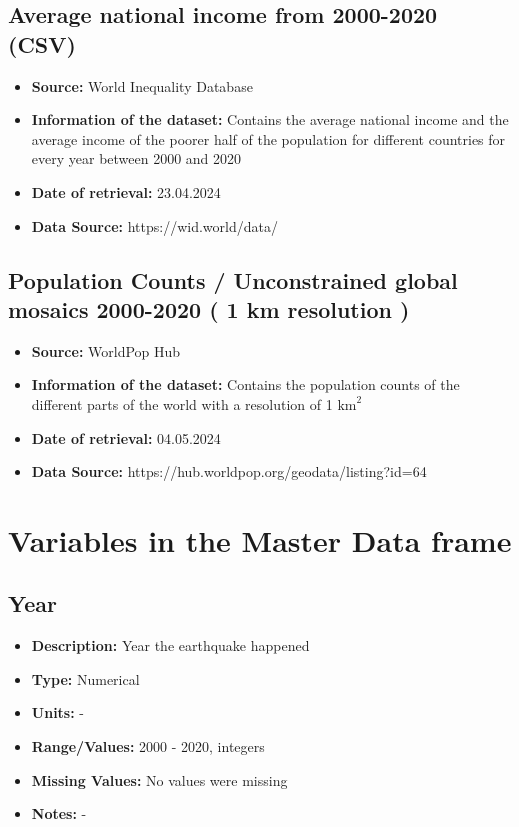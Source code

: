 \documentclass[a4paper]{article}
\begin{document}
\subsection{Average national income from 2000-2020 (CSV)}
\begin{itemize}
\item \textbf{Source:} World Inequality Database
\item \textbf{Information of the dataset:} Contains the average national income and the average income of the poorer half of the population for different countries for every year between 2000 and 2020
\item \textbf{Date of retrieval:} 23.04.2024
\item \textbf{Data Source:} https://wid.world/data/
\end{itemize}

\subsection{Population Counts / Unconstrained global mosaics 2000-2020 ( 1 km resolution )}
\begin{itemize}
\item \textbf{Source:} WorldPop Hub
\item \textbf{Information of the dataset:} Contains the population counts of the different parts of the world with a resolution of 1 $\text{km}^2$
\item \textbf{Date of retrieval:} 04.05.2024
\item \textbf{Data Source:} https://hub.worldpop.org/geodata/listing?id=64
\end{itemize}

\section{Variables in the Master Data frame}

\subsection{Year}
\begin{itemize}
    \item \textbf{Description:} Year the earthquake happened
    \item \textbf{Type:} Numerical
    \item \textbf{Units:} -
    \item \textbf{Range/Values:} 2000 - 2020, integers
    \item \textbf{Missing Values:} No values were missing
    \item \textbf{Notes:} -
\end{itemize}
\end{document}
